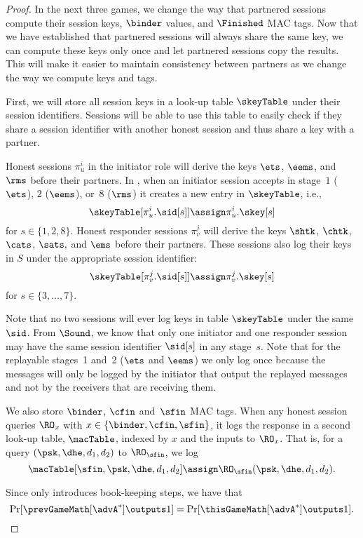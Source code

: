 \begin{proof}
In the next three games, we change the way that partnered sessions compute their session keys, $\binder$ values, and $\Finished$ MAC tags. 
Now that we have established that partnered sessions will always share the same key, we can compute these keys only once and let partnered sessions copy the results. 
This will make it easier to maintain consistency between partners as we change the way we compute keys and tags.

	First, we will store all session keys in a look-up table $\skeyTable$ under their session identifiers.
	Sessions will be able to use this table to easily check if they share a session identifier with another honest session and thus share a key with a partner.
	
	Honest sessions $\pi_u^i$ in the initiator role will derive the keys $\ets$, $\eems$, and $\rms$ before their partners. 
	In \thisGame, when an initiator session accepts in stage~$1$ ($\ets$), $2$ ($\eems$), or~$8$ ($\rms$) it creates a new entry in $\skeyTable$, i.e.,
	\[
		\skeyTable[\pi_u^i.\sid[s]] \assign \pi_u^i.\skey[s]
	\]
	for $s \in \{1,2,8\}$.
	Honest responder sessions $\pi_v^j$ will derive the keys $\shtk$, $\chtk$, 
	$\cats$, $\sats,$ and $\ems$ before their partners. 
	These sessions also log their keys in $S$ under the appropriate session identifier:  
	\[
		\skeyTable[\pi_v^j.\sid[s]] \assign \pi_v^j.\skey[s]
	\]
	for $s \in \{3,\dotsc,7\}$.
	
	Note that no two sessions will ever log keys in table $\skeyTable$ under the same $\sid$.
	From $\Sound$, we know that only one initiator and one responder session may have the same session identifier $\sid[s]$ in any stage~$s$.
	Note that for the replayable stages~1 and~2 ($\ets$ and $\eems$) we only log once because the messages will only be logged by the initiator that output the replayed messages and not by the receivers that are receiving them.
	
	We also store $\binder$, $\cfin$ and~$\sfin$ MAC tags.
	When any honest session queries $\RO_x$ with $x \in \{\binder, \cfin, \sfin\}$, it logs the response in a second look-up table, $\macTable$, indexed by $x$ and the inputs to $\RO_x$.
	That is, for a query $(\psk, \dhe, d_1, d_2)$ to $\RO_{\sfin}$, we log
	\[
		\macTable[ \sfin, \psk, \dhe, d_1, d_2 ] \assign \RO_{\sfin}(\psk, \dhe, d_1, d_2).
	\]
	
	\noindent
	Since \thisGame only introduces book-keeping steps, we have that
	\[
		\Pr[ \prevGameMath[\advA^*] \outputs 1 ] = \Pr[ \thisGameMath[\advA^*] \outputs 1 ].
	\]
	

\end{proof}
